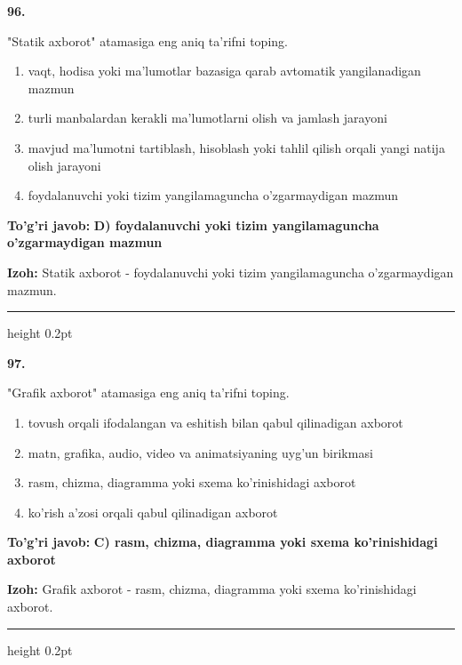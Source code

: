 \documentclass[10pt,a4paper,oneside]{article}
\begin{document}
\noindent\textbf{\color{ink}96.}
\par
"Statik axborot" atamasiga eng aniq ta'rifni toping.
\begin{enumerate}[label=\Alph*),leftmargin=9mm]
\item vaqt, hodisa yoki ma'lumotlar bazasiga qarab avtomatik yangilanadigan mazmun
\item turli manbalardan kerakli ma'lumotlarni olish va jamlash jarayoni
\item mavjud ma'lumotni tartiblash, hisoblash yoki tahlil qilish orqali yangi natija olish jarayoni
\item foydalanuvchi yoki tizim yangilamaguncha o'zgarmaydigan mazmun
\end{enumerate}
\begin{tcolorbox}[enhanced,breakable,colback=teal!4,colframe=teal!50!black,boxrule=0.5pt,arc=1.1mm,left=3mm,right=3mm,top=1.7mm,bottom=1.7mm,before skip=2mm,after skip=2mm]
\textbf{\color{teal}To'g'ri javob:} \textbf{D) foydalanuvchi yoki tizim yangilamaguncha o'zgarmaydigan mazmun}
\par\smallskip
\textbf{Izoh:} Statik axborot - foydalanuvchi yoki tizim yangilamaguncha o'zgarmaydigan mazmun.
\end{tcolorbox}
\vspace{2mm}\hrule height 0.2pt \vspace{3mm}

\noindent\textbf{\color{ink}97.}
\par
"Grafik axborot" atamasiga eng aniq ta'rifni toping.
\begin{enumerate}[label=\Alph*),leftmargin=9mm]
\item tovush orqali ifodalangan va eshitish bilan qabul qilinadigan axborot
\item matn, grafika, audio, video va animatsiyaning uyg'un birikmasi
\item rasm, chizma, diagramma yoki sxema ko'rinishidagi axborot
\item ko'rish a'zosi orqali qabul qilinadigan axborot
\end{enumerate}
\begin{tcolorbox}[enhanced,breakable,colback=teal!4,colframe=teal!50!black,boxrule=0.5pt,arc=1.1mm,left=3mm,right=3mm,top=1.7mm,bottom=1.7mm,before skip=2mm,after skip=2mm]
\textbf{\color{teal}To'g'ri javob:} \textbf{C) rasm, chizma, diagramma yoki sxema ko'rinishidagi axborot}
\par\smallskip
\textbf{Izoh:} Grafik axborot - rasm, chizma, diagramma yoki sxema ko'rinishidagi axborot.
\end{tcolorbox}
\vspace{2mm}\hrule height 0.2pt \vspace{3mm}
\end{document}
